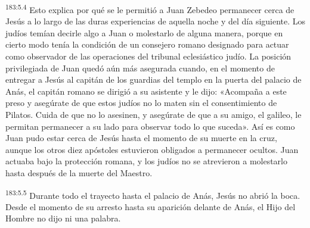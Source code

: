 \par 
\textsuperscript{183:5.4} Esto explica por qué se le permitió a Juan Zebedeo permanecer cerca de Jesús a lo largo de las duras experiencias de aquella noche y del día siguiente. Los judíos temían decirle algo a Juan o molestarlo de alguna manera, porque en cierto modo tenía la condición de un consejero romano designado para actuar como observador de las operaciones del tribunal eclesiástico judío. La posición privilegiada de Juan quedó aún más asegurada cuando, en el momento de entregar a Jesús al capitán de los guardias del templo en la puerta del palacio de Anás, el capitán romano se dirigió a su asistente y le dijo: «Acompaña a este preso y asegúrate de que estos judíos no lo maten sin el consentimiento de Pilatos. Cuida de que no lo asesinen, y asegúrate de que a su amigo, el galileo, le permitan permanecer a su lado para observar todo lo que suceda». Así es como Juan pudo estar cerca de Jesús hasta el momento de su muerte en la cruz, aunque los otros diez apóstoles estuvieron obligados a permanecer ocultos. Juan actuaba bajo la protección romana, y los judíos no se atrevieron a molestarlo hasta después de la muerte del Maestro.

\par 
\textsuperscript{183:5.5} Durante todo el trayecto hasta el palacio de Anás, Jesús no abrió la boca. Desde el momento de su arresto hasta su aparición delante de Anás, el Hijo del Hombre no dijo ni una palabra.